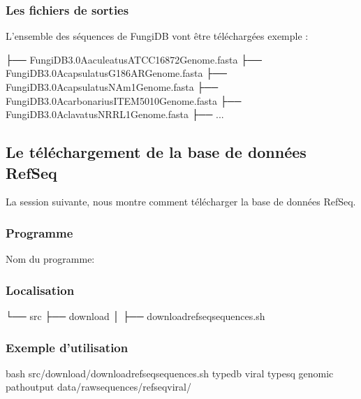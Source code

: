 \documentclass[letterpaper,10pt,french]{sphinxmanual}
\begin{document}
\subsubsection{Les fichiers de sorties}
\label{\detokenize{tutorial:id13}}
L’ensemble des séquences de FungiDB vont être téléchargées exemple :

\begin{sphinxVerbatim}[commandchars=\\\{\}]
├── FungiDB\PYGZhy{}3.0\PYGZus{}Aaculeatus\PYGZus{}ATCC16872\PYGZus{}Genome.fasta
├── FungiDB\PYGZhy{}3.0\PYGZus{}Acapsulatus\PYGZus{}G186AR\PYGZus{}Genome.fasta
├── FungiDB\PYGZhy{}3.0\PYGZus{}Acapsulatus\PYGZus{}NAm1\PYGZus{}Genome.fasta
├── FungiDB\PYGZhy{}3.0\PYGZus{}Acarbonarius\PYGZus{}ITEM5010\PYGZus{}Genome.fasta
├── FungiDB\PYGZhy{}3.0\PYGZus{}Aclavatus\PYGZus{}NRRL1\PYGZus{}Genome.fasta
├── ...
\end{sphinxVerbatim}


\subsection{Le téléchargement de la base de données RefSeq}
\label{\detokenize{tutorial:le-telechargement-de-la-base-de-donnees-refseq}}\label{\detokenize{tutorial:download-refseq}}
La session suivante, nous montre comment télécharger la base de données RefSeq.


\subsubsection{Programme}
\label{\detokenize{tutorial:id14}}
Nom du programme:

\begin{sphinxVerbatim}[commandchars=\\\{\}]
\end{sphinxVerbatim}


\subsubsection{Localisation}
\label{\detokenize{tutorial:id15}}
\begin{sphinxVerbatim}[commandchars=\\\{\}]
└── src
 ├── download
 │   ├── download\PYGZus{}refseq\PYGZus{}sequences.sh
\end{sphinxVerbatim}


\subsubsection{Exemple d’utilisation}
\label{\detokenize{tutorial:id16}}
\begin{sphinxVerbatim}[commandchars=\\\{\}]
bash src/download/download\PYGZus{}refseq\PYGZus{}sequences.sh 
     \PYGZhy{}type\PYGZus{}db viral 
     \PYGZhy{}type\PYGZus{}sq genomic 
     \PYGZhy{}path\PYGZus{}output data/raw\PYGZus{}sequences/refseq\PYGZus{}viral/
\end{sphinxVerbatim}
\end{document}
